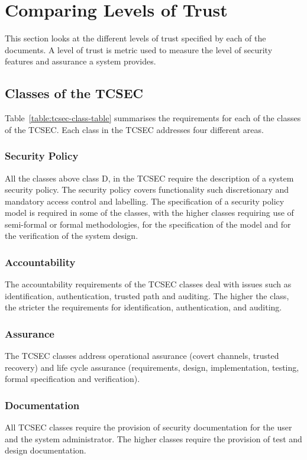 \section{Comparing Levels of Trust}
This section looks at the different levels of trust specified by each of the documents.
A level of trust is metric used to measure the level of security features and assurance
a system provides.

\subsection{Classes of the TCSEC}
\label{tcsec-classes}

    Table~\ref{table:tcsec-class-table} summarises the requirements for each of the 
    classes of the TCSEC. Each class in the TCSEC addresses four different
    areas.

    \subsubsection{Security Policy}
    All the classes above class D, in the TCSEC require the description of a system security policy.
    The security policy covers functionality such discretionary and mandatory access control and labelling.
    The specification of a security policy model is required in some of the classes, with the higher
    classes requiring use of semi-formal or formal methodologies, for the specification of the model
    and for the verification of the system design.

    \subsubsection{Accountability}
    The accountability requirements of the TCSEC classes deal with issues such as identification,
    authentication, trusted path and auditing. The higher the class, the stricter the requirements
    for identification, authentication, and auditing.

    \subsubsection{Assurance}
    The TCSEC classes address operational assurance (covert channels, trusted recovery)
    and life cycle assurance (requirements, design, implementation, testing, formal specification
    and verification).

    \subsubsection{Documentation}
    All TCSEC classes require the provision of security documentation for the user and
    the system administrator. The higher classes require the provision of test and design
    documentation.

